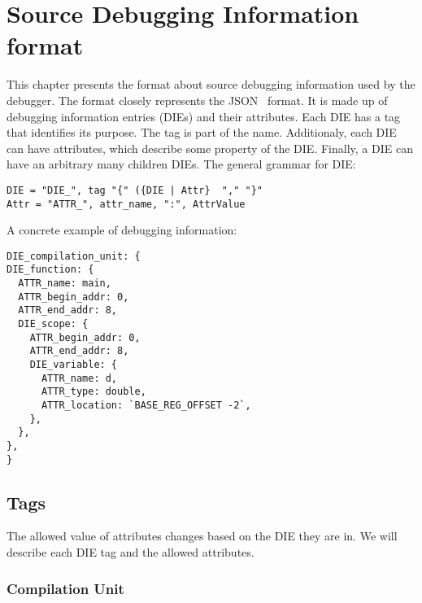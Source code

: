 \chapter{Source Debugging Information format}
This chapter presents the format about source debugging information used by the
debugger. The format closely represents the JSON~\cite{json} format. It is made
up of debugging information entries (DIEs) and their attributes. Each DIE has a
tag that identifies its purpose. The tag is part of the name. Additionaly, each
DIE can have attributes, which describe some property of the DIE. Finally, a
DIE can have an arbitrary many children DIEs. The general grammar for DIE:
\begin{lstlisting}
DIE = "DIE_", tag "{" ({DIE | Attr}  "," "}"
Attr = "ATTR_", attr_name, ":", AttrValue
\end{lstlisting}

A concrete example of debugging information:
\begin{lstlisting}
DIE_compilation_unit: {
DIE_function: {
  ATTR_name: main,
  ATTR_begin_addr: 0,
  ATTR_end_addr: 8,
  DIE_scope: {
    ATTR_begin_addr: 0,
    ATTR_end_addr: 8, 
    DIE_variable: {
      ATTR_name: d,
      ATTR_type: double,
      ATTR_location: `BASE_REG_OFFSET -2`,
    },
  },
},
}
\end{lstlisting}

\section{Tags}
The allowed value of attributes changes based on the DIE they are in. We will
describe each DIE tag and the allowed attributes.

\subsection{Compilation Unit}

